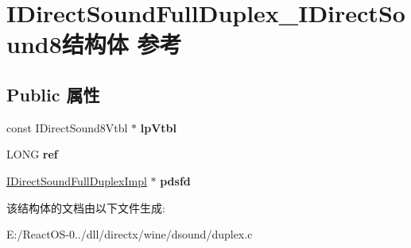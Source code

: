 \hypertarget{struct_i_direct_sound_full_duplex___i_direct_sound8}{}\section{I\+Direct\+Sound\+Full\+Duplex\+\_\+\+I\+Direct\+Sound8结构体 参考}
\label{struct_i_direct_sound_full_duplex___i_direct_sound8}
\subsection*{Public 属性}
\begin{DoxyCompactItemize}
\item 
\mbox{\label{struct_i_direct_sound_full_duplex___i_direct_sound8_a4904240f5a018d354c8d30053ca89755}} 
const I\+Direct\+Sound8\+Vtbl $\ast$ {\bfseries lp\+Vtbl}
\item 
\mbox{\label{struct_i_direct_sound_full_duplex___i_direct_sound8_adce064e2a1aa5a32916a1f479c628507}} 
L\+O\+NG {\bfseries ref}
\item 
\mbox{\label{struct_i_direct_sound_full_duplex___i_direct_sound8_a44eb9925a410a3fd4f8e447f75094a63}} 
\hyperlink{struct_i_direct_sound_full_duplex_impl}{I\+Direct\+Sound\+Full\+Duplex\+Impl} $\ast$ {\bfseries pdsfd}
\end{DoxyCompactItemize}


该结构体的文档由以下文件生成\+:\begin{DoxyCompactItemize}
\item 
E\+:/\+React\+O\+S-\/0../dll/directx/wine/dsound/duplex.\+c\end{DoxyCompactItemize}
